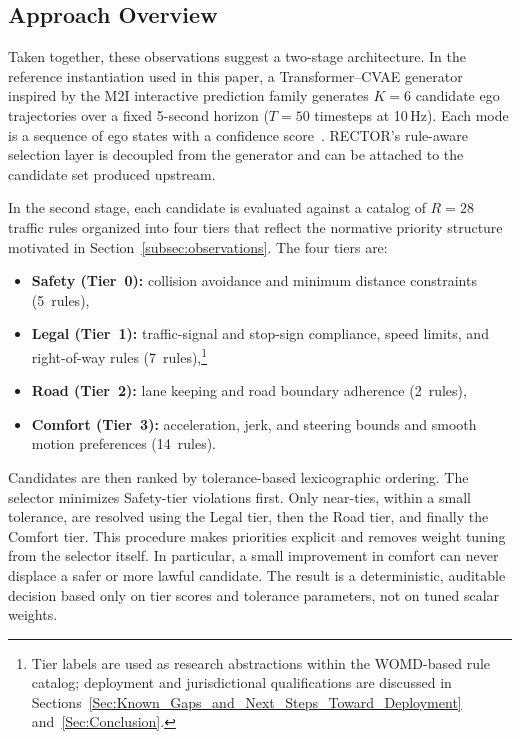 \subsection{Approach Overview}
\label{subsec:approach}

Taken together, these observations suggest a two-stage architecture. In the reference instantiation used in this paper, a Transformer--CVAE generator inspired by the M2I interactive prediction family generates $K=6$ candidate ego trajectories over a fixed 5-second horizon ($T=50$ timesteps at 10\,Hz). Each mode is a sequence of ego states with a confidence score~\cite{Sun_2022}.  RECTOR's rule-aware selection layer is decoupled from the generator and can be attached to the candidate set produced upstream.

In the second stage, each candidate is evaluated against a catalog of $R{=}28$ traffic rules organized into four tiers that reflect the normative priority structure motivated in Section~\ref{subsec:observations}.  The four tiers are:
\begin{itemize}[leftmargin=1.5em] 

\item \textbf{Safety (Tier~0):} collision avoidance and minimum distance
constraints (5~rules), 

\item \textbf{Legal (Tier~1):} traffic-signal and stop-sign compliance, speed limits, and right-of-way rules (7~rules),\footnote{Tier labels are used as research abstractions within the WOMD-based rule catalog; deployment and jurisdictional qualifications are discussed in Sections~\ref{Sec:Known_Gaps_and_Next_Steps_Toward_Deployment} and~\ref{Sec:Conclusion}.}


\item \textbf{Road (Tier~2):} lane keeping and road boundary adherence
(2~rules), \item \textbf{Comfort (Tier~3):} acceleration, jerk, and steering bounds
and smooth motion preferences (14~rules).

\end{itemize}

\noindent
Candidates are then ranked by tolerance-based lexicographic ordering. The selector minimizes Safety-tier violations first. Only near-ties, within a small tolerance, are resolved using the Legal tier, then the Road tier, and finally the Comfort tier. This procedure makes priorities explicit and removes weight tuning from the selector itself. In particular, a small improvement in comfort can never displace a safer or more lawful candidate. The result is a deterministic, auditable decision based only on tier scores and tolerance parameters, not on tuned scalar weights.

